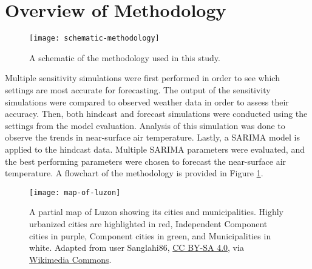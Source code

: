 
\section{Overview of Methodology}

	\begin{figure}	
		\centering
		\texttt{[image: schematic-methodology]}		
		\caption{
			A schematic of the methodology used in this study.
		}
		\label{fig:schematic-method}
	\end{figure}	
		
	Multiple sensitivity simulations were first performed in order to see which settings are most accurate for forecasting.
	The output of the sensitivity simulations were compared to observed weather data in order to assess their accuracy.
	Then, both hindcast and forecast simulations were conducted using the settings from the model evaluation.
	Analysis of this simulation was done to observe the trends in near-surface air temperature.
	Lastly, a SARIMA model is applied to the hindcast data.
	Multiple SARIMA parameters were evaluated, and the best performing parameters were chosen to forecast the near-surface air temperature.
	A flowchart of the methodology is provided in Figure \ref{fig:schematic-method}.

	
	\begin{figure}
		\centering
		\texttt{[image: map-of-luzon]}
		\caption{
			A partial map of Luzon showing its cities and municipalities.
			Highly urbanized cities are highlighted in red,
				Independent Component cities in purple,
				Component cities in green, and
				Municipalities in white.
			Adapted from user Sanglahi86, 	
				\href{https://creativecommons.org/licenses/by-sa/4.0}{CC BY-SA 4.0},
				via \href{https://commons.wikimedia.org/wiki/File:Cities_and_municipalities_of_the_Philippines.png}{Wikimedia Commons}.
		}
		\label{fig:map-of-metro-manila}
	\end{figure}	
		

